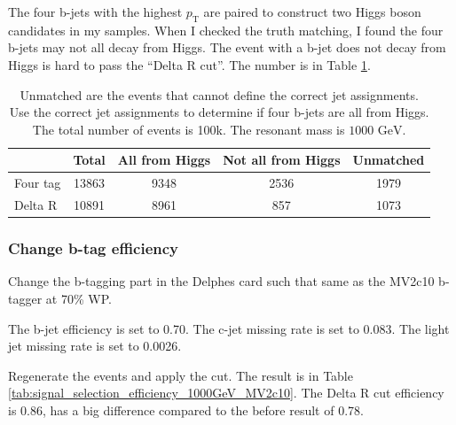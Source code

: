 \documentclass[12pt]{article}
\begin{document}
		The four b-jets with the highest $p_\text{T}$ are paired to construct two Higgs boson candidates in my samples. When I checked the truth matching, I found the four b-jets may not all decay from Higgs. The event with a b-jet does not decay from Higgs is hard to pass the ``Delta R cut''. The number is in Table \ref{tab:signal_selection_compared_with_truth_matching_1000GeV}. 
			\begin{table}[htpb]
				\centering
				\caption{Unmatched are the events that cannot define the correct jet assignments. Use the correct jet assignments to determine if four b-jets are all from Higgs. The total number of events is 100k. The resonant mass is $\text{1000 GeV}$.}
				\label{tab:signal_selection_compared_with_truth_matching_1000GeV}
				\begin{tabular}{l|c|ccc}
							 & Total & All from Higgs & Not all from Higgs & Unmatched\\ \hline
					Four tag & 13863 & 9348    & 2536  & 1979   \\
					Delta R  & 10891 & 8961    & 857   & 1073    
				\end{tabular}
			\end{table}

		\subsubsection{Change b-tag efficiency}%
		\label{subs:change_b_tag_efficiency}
			Change the b-tagging part in the Delphes card such that same as the MV2c10 b-tagger at 70\% WP. 

			The b-jet efficiency is set to 0.70. The c-jet missing rate is set to 0.083. The light jet missing rate is set to 0.0026.

			Regenerate the events and apply the cut. The result is in Table \ref{tab:signal_selection_efficiency_1000GeV_MV2c10}. The Delta R cut efficiency is 0.86, has a big difference compared to the before result of 0.78.
\end{document}
